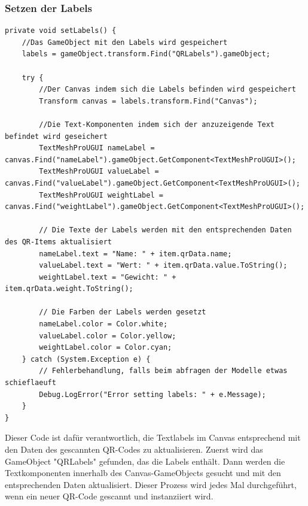 \begin{itemize}
\subsubsection*{Setzen der Labels}
\begin{lstlisting}[style=csharp, caption={Setzen der Labels}, label=code:labels]
private void setLabels() {
    //Das GameObject mit den Labels wird gespeichert
    labels = gameObject.transform.Find("QRLabels").gameObject;

    try {
        //Der Canvas indem sich die Labels befinden wird gespeichert
        Transform canvas = labels.transform.Find("Canvas");

        //Die Text-Komponenten indem sich der anzuzeigende Text befindet wird geseichert
        TextMeshProUGUI nameLabel = canvas.Find("nameLabel").gameObject.GetComponent<TextMeshProUGUI>();
        TextMeshProUGUI valueLabel = canvas.Find("valueLabel").gameObject.GetComponent<TextMeshProUGUI>();
        TextMeshProUGUI weightLabel = canvas.Find("weightLabel").gameObject.GetComponent<TextMeshProUGUI>();

        // Die Texte der Labels werden mit den entsprechenden Daten des QR-Items aktualisiert
        nameLabel.text = "Name: " + item.qrData.name;
        valueLabel.text = "Wert: " + item.qrData.value.ToString();
        weightLabel.text = "Gewicht: " + item.qrData.weight.ToString();

        // Die Farben der Labels werden gesetzt
        nameLabel.color = Color.white;
        valueLabel.color = Color.yellow;
        weightLabel.color = Color.cyan;
    } catch (System.Exception e) {
        // Fehlerbehandlung, falls beim abfragen der Modelle etwas schieflaeuft
        Debug.LogError("Error setting labels: " + e.Message);
    }
}
\end{lstlisting}

Dieser Code ist dafür verantwortlich, die Textlabels im Canvas entsprechend mit den Daten des gescannten QR-Codes zu aktualisieren. Zuerst wird das GameObject "QRLabels" gefunden, das die Labels enthält. Dann werden die Textkomponenten innerhalb des Canvas-GameObjects gesucht und mit den entsprechenden Daten aktualisiert. Dieser Prozess wird jedes Mal durchgeführt, wenn ein neuer QR-Code gescannt und instanziiert wird.


\end{itemize}

